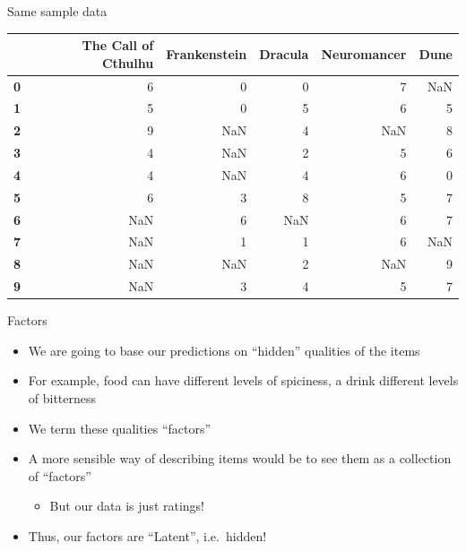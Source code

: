 \documentclass[obeyspaces]{beamer}
\providecommand{\tightlist}{%
  \setlength{\itemsep}{0pt}\setlength{\parskip}{0pt}}
\begin{document}
\begin{frame}{Same sample data}

\center

\tiny

\begin{tabular}{lrrrrr}    
\toprule
{} &  \textbf{The Call of Cthulhu} &   \bf Frankenstein &   \bf Dracula &   \bf Neuromancer & \bf  Dune \\
\midrule
\bf 0 &                    6 &              0 &         0 &             7 &             NaN \\
\bf 1 &                    5 &              0 &         5 &             6 &               5 \\
\bf 2 &                    9 &            NaN &         4 &           NaN &               8 \\
\bf 3 &                    4 &            NaN &         2 &             5 &               6 \\
\bf 4 &                    4 &            NaN &         4 &             6 &               0 \\
\bf 5 &                    6 &              3 &         8 &             5 &               7 \\
\bf 6 &                  NaN &              6 &       NaN &             6 &               7 \\
\bf 7 &                  NaN &              1 &         1 &             6 &             NaN \\
\bf 8 &                  NaN &            NaN &         2 &           NaN &               9 \\
\bf 9 &                  NaN &              3 &         4 &             5 &               7 \\
\bottomrule
\end{tabular}

\end{frame}

\begin{frame}{Factors}

\begin{itemize}
\tightlist
\item
  We are going to base our predictions on ``hidden'' qualities of the
  items
\item
  For example, food can have different levels of spiciness, a drink
  different levels of bitterness
\item
  We term these qualities ``factors''
\item
  A more sensible way of describing items would be to see them as a
  collection of ``factors''

  \begin{itemize}
  \tightlist
  \item
    But our data is just ratings!
  \end{itemize}
\item
  Thus, our factors are ``Latent'', i.e.~hidden!
\end{itemize}

\end{frame}
\end{document}
